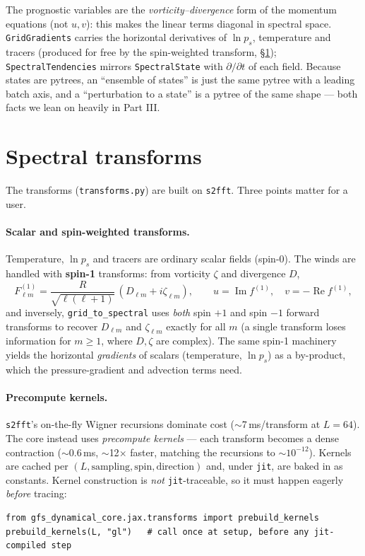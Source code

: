 \documentclass[11pt]{article}
\newcommand{\code}[1]{\texttt{#1}}
\begin{document}
The prognostic variables are the \emph{vorticity--divergence} form of the momentum
equations (not $u,v$): this makes the linear terms diagonal in spectral space.
\code{GridGradients} carries the horizontal derivatives of $\ln p_s$, temperature
and tracers (produced for free by the spin-weighted transform, \S\ref{sec:transforms});
\code{SpectralTendencies} mirrors \code{SpectralState} with $\partial/\partial t$
of each field. Because states are pytrees, an ``ensemble of states'' is just the
same pytree with a leading batch axis, and a ``perturbation to a state'' is a
pytree of the same shape --- both facts we lean on heavily in Part III.

\section{Spectral transforms}\label{sec:transforms}

The transforms (\code{transforms.py}) are built on \code{s2fft}. Three points
matter for a user.

\paragraph{Scalar and spin-weighted transforms.} Temperature, $\ln p_s$ and
tracers are ordinary scalar fields (spin-0). The winds are handled with
\textbf{spin-1} transforms: from vorticity $\zeta$ and divergence $D$,
\begin{equation}
  F^{(1)}_{\ell m} = \frac{R}{\sqrt{\ell(\ell+1)}}\,(D_{\ell m} + i\zeta_{\ell m}),
  \qquad u = \operatorname{Im} f^{(1)},\quad v = -\operatorname{Re} f^{(1)},
\end{equation}
and inversely, \code{grid\_to\_spectral} uses \emph{both} spin $+1$ and spin $-1$
forward transforms to recover $D_{\ell m}$ and $\zeta_{\ell m}$ exactly for all
$m$ (a single transform loses information for $m\ge 1$, where $D,\zeta$ are
complex). The same spin-1 machinery yields the horizontal \emph{gradients} of
scalars (temperature, $\ln p_s$) as a by-product, which the pressure-gradient and
advection terms need.

\paragraph{Precompute kernels.} \code{s2fft}'s on-the-fly Wigner recursions
dominate cost ($\sim$7\,ms/transform at $L=64$). The core instead uses
\emph{precompute kernels} --- each transform becomes a dense contraction
($\sim$0.6\,ms, $\sim$12$\times$ faster, matching the recursions to $\sim$$10^{-12}$).
Kernels are cached per $(L,\text{sampling},\text{spin},\text{direction})$ and,
under \code{jit}, are baked in as constants. Kernel construction is \emph{not}
\code{jit}-traceable, so it must happen eagerly \emph{before} tracing:
\begin{lstlisting}
from gfs_dynamical_core.jax.transforms import prebuild_kernels
prebuild_kernels(L, "gl")   # call once at setup, before any jit-compiled step
\end{lstlisting}
\end{document}
